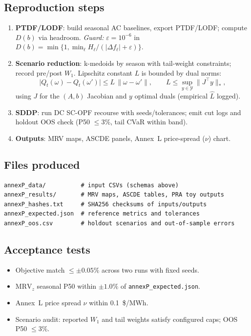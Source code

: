 \documentclass[11pt]{article}
\newcommand{\MRV}{\ensuremath{\mathrm{MRV}}}
\numberwithin{equation}{section}
\theoremstyle{definition}
\theoremstyle{remark}
\begin{document}
\subsection{Reproduction steps}
\begin{enumerate}[leftmargin=1.2em]
\item \textbf{PTDF/LODF}: build seasonal AC baselines, export PTDF/LODF; compute $D(b)$ via headroom.
      \emph{Guard:} $\varepsilon=10^{-6}$ in $D(b)=\min\{1,\min_\ell H_\ell/(|\Delta f_\ell|+\varepsilon)\}$.
\item \textbf{Scenario reduction}: k-medoids by season with tail-weight constraints; record pre/post $W_1$.
      Lipschitz constant $L$ is bounded by dual norms:
      \[
      \big|Q_t(\omega)-Q_t(\omega')\big|\le
      L\,\|\omega-\omega'\|,
      \qquad
      L \le \sup_{y\in\mathcal{Y}}\big\|J^\top y\big\|_*,
      \]
      using $J$ for the $(A,b)$ Jacobian and $y$ optimal duals (empirical $\widehat L$ logged).
\item \textbf{SDDP}: run DC SC-OPF recourse with seeds/tolerances; emit cut logs and holdout OOS check
      (P50 $\le 3\%$, tail CVaR within band).
\item \textbf{Outputs}: MRV maps, ASCDE panels, Annex~L price-spread ($\nu$) chart.
\end{enumerate}

\subsection{Files produced}
\begin{lstlisting}[style=annexpseudo,caption={Artifacts emitted by the capsule},label={lst:annexP_artifacts}]
annexP_data/          # input CSVs (schemas above)
annexP_results/       # MRV maps, ASCDE tables, PRA toy outputs
annexP_hashes.txt     # SHA256 checksums of inputs/outputs
annexP_expected.json  # reference metrics and tolerances
annexP_oos.csv        # holdout scenarios and out-of-sample errors
\end{lstlisting}

\subsection{Acceptance tests}
\begin{itemize}[leftmargin=1.2em]
\item Objective match $\le \pm 0.05\%$ across two runs with fixed seeds.
\item $\MRV_{z}$ seasonal P50 within $\pm 1.0\%$ of \texttt{annexP\_expected.json}.
\item Annex~L price spread $\nu$ within \SI{0.1}{\$/MWh}.
\item Scenario audit: reported $W_1$ and tail weights satisfy configured caps; OOS P50 $\le 3\%$.
\end{itemize}
\end{document}
